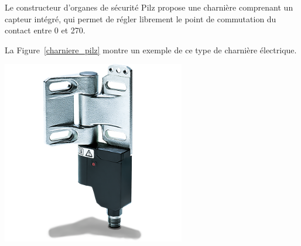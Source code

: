 \begin{minipage}[c]{0.6\textwidth}
    Le constructeur d'organes de sécurité Pilz propose une charnière comprenant un capteur intégré, qui permet de régler librement le point de commutation du contact entre 0\textdegree{} et 270\textdegree{}.

    La Figure~\ref{charniere_pilz} montre un exemple de ce type de charnière électrique.
\end{minipage}\hfill
\begin{minipage}[c]{0.35\textwidth}
    \begin{center}
        \includegraphics[width=0.6\textwidth]{assets/figures/Protections_laser/Securite_electrique/charniere_pilz.png}
    \end{center}
    \label{charniere_pilz}
\end{minipage}

